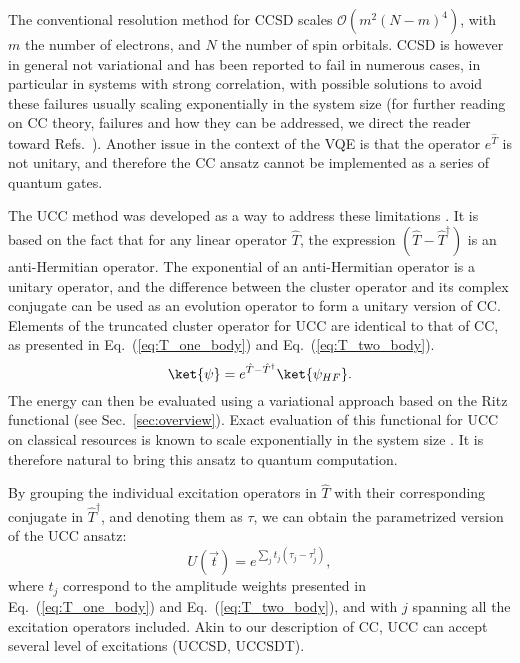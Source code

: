 The conventional resolution method for CCSD scales $\mathcal{O}(m^2(N - m)^4)$, with $m$ the number of electrons, and $N$ the number of spin orbitals. CCSD is however in general not variational and has been reported to fail in numerous cases, in particular in systems with strong correlation, with possible solutions to avoid these failures usually scaling exponentially in the system size (for further reading on CC theory, failures and how they can be addressed, we direct the reader toward Refs.~\cite{Paldus1984, Piecuch1995, Small2012, Small2014, Lee2017, Lee2018}). Another issue in the context of the VQE is that the operator $e^{\hat{T}}$ is not unitary, and therefore the CC ansatz cannot be implemented as a series of quantum gates.

The UCC method was developed as a way to address these limitations \cite{Bartlett1989, Taube2006, Filip2020}. It is based on the fact that for any linear operator $\hat{T}$, the expression $(\hat{T} -\hat{T}^{\dagger})$ is an anti-Hermitian operator. The exponential of an anti-Hermitian operator is a unitary operator, and the difference between the cluster operator and its complex conjugate can be used as an evolution operator to form a unitary version of CC. Elements of the truncated cluster operator for UCC are identical to that of CC, as presented in Eq.~(\ref{eq:T_one_body}) and Eq.~(\ref{eq:T_two_body}).
\begin{equation}
    \ket{\psi} = e^{\hat{T} - \hat{T}^\dagger} \ket{\psi_{HF}}.
\end{equation}
The energy can then be evaluated using a variational approach based on the Ritz functional (see Sec.~\ref{sec:overview}). Exact evaluation of this functional for UCC on classical resources is known to scale exponentially in the system size \cite{Taube2006}. It is therefore natural to bring this ansatz to quantum computation.

By grouping the individual excitation operators in $\hat{T}$ with their corresponding conjugate in $\hat{T}^{\dagger}$, and denoting them as $\tau$, we can obtain the parametrized version of the UCC ansatz:
\begin{equation} \label{eq:ucca}
U(\vec{t}) = e^{\sum_j t_j(\tau_j - \tau^\dagger _j)},
\end{equation}
where $t_j$ correspond to the amplitude weights presented in Eq.~(\ref{eq:T_one_body}) and Eq.~(\ref{eq:T_two_body}), and with $j$ spanning all the excitation operators included. Akin to our description of CC, UCC can accept several level of excitations (UCCSD, UCCSDT).

